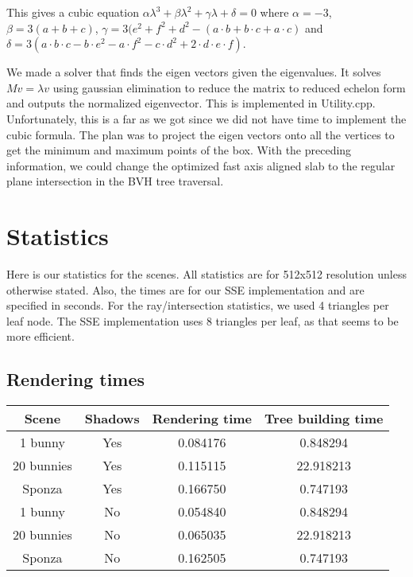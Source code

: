 \documentclass{article} %
\begin{document}
This gives a cubic equation $\alpha \lambda^3 + \beta \lambda^2 + \gamma \lambda + \delta = 0$ where $\alpha =-3$, $\beta=3(a + b + c)$, $\gamma=3(e^2 + f^2 + d^2 - (a\cdot b + b\cdot c + a\cdot c)$ and $\delta=3(a\cdot b\cdot c - b\cdot e^2 -a\cdot f^2 - c\cdot d^2 + 2\cdot d\cdot e\cdot f)$.

We made a solver that finds the eigen vectors given the eigenvalues.  It solves $Mv=\lambda v$ using gaussian elimination to reduce the matrix to reduced echelon form and outputs the normalized eigenvector. This is implemented in Utility.cpp. Unfortunately, this is a far as we got since we did not have time to implement the cubic formula. The plan was to project the eigen vectors onto all the vertices to get the minimum and maximum points of the box. With the preceding information, we could change the optimized fast axis aligned slab to the regular plane intersection in the BVH tree traversal. 

\section{Statistics}
Here is our statistics for the scenes. All statistics are for 512x512 resolution unless otherwise stated. Also, the times are for our SSE implementation and are specified in seconds. For the ray/intersection statistics, we used 4 triangles per leaf node. The SSE implementation uses 8 triangles per leaf, as that seems to be more efficient.

\subsection{Rendering times}
\begin{tabular}{cccc}
{\bf Scene} & {\bf Shadows} & {\bf Rendering time} & {\bf Tree building time}\\
\hline
1 bunny     & Yes & 0.084176 & 0.848294\\
20 bunnies  & Yes & 0.115115 & 22.918213\\
Sponza      & Yes & 0.166750 & 0.747193\\
1 bunny     & No  & 0.054840 & 0.848294\\
20 bunnies  & No  & 0.065035 & 22.918213\\
Sponza      & No  & 0.162505 & 0.747193\\
\end{tabular}
\end{document}
